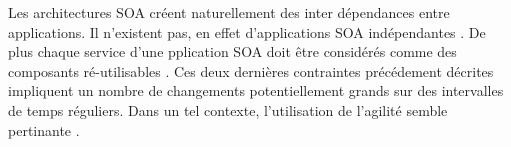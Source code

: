 \documentclass[12pt,a4paper,utf8x]{article}
\begin{document}
Les architectures SOA créent naturellement des inter dépendances entre applications. Il n'existent pas, en effet d'applications SOA \og{} indépendantes \fg{}. De plus chaque service d'une pplication SOA doit être considérés comme des composants \og ré-utilisables \fg{}. Ces deux dernières contraintes précédement décrites impliquent un nombre de changements potentiellement grands sur des intervalles de temps réguliers. Dans un tel contexte, l'utilisation de l'agilité semble pertinante \cite{ibm}.  



% 
%
% 
% 
% 


% 


\end{document}
